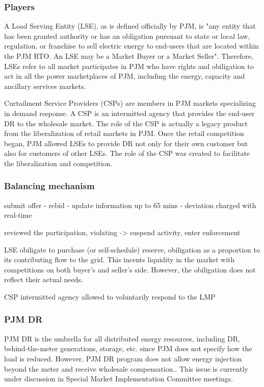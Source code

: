 \subsubsection{Players}
A Load Serving Entity (LSE), as is defined officially by PJM, is "any entity that has been granted authority or has an obligation pursuant to state or local law, regulation, or franchise to sell electric energy to end-users that are located within the PJM RTO. An LSE may be a Market Buyer or a Market Seller"\cite{PJM2017b}. Therefore, LSEs refer to all market participates in PJM who have rights and obiligation to act in all the power marketplaces of PJM, including the energy, capacity and ancillary services markets. 

Curtailment Service Providers (CSPs) are members in PJM markets specializing in demand response. A CSP is an intermitted agency that provides the end-user DR to the wholesale market. \cite{PJM2017b} \cite{Wang2015} The role of the CSP is actually a legacy product from the liberalization of retail markets in PJM. Once the retail competition began, PJM allowed LSEs to provide DR not only for their own customer but also for customers of other LSEs. The role of the CSP was created to facilitate the liberalization and competition. \cite{PJMInterconnection2017}

\subsubsection{Balancing mechanism}
submit offer - rebid - update information up to 65 mins - deviation charged with real-time

reviewed the participation, violating -> suspend activity, enter enforcement

LSE obiligate to purchase (or self-schedule) reserve, obiligation as a proportion to its contributing flow to the grid. \cite{PJM2017c} This incents liquidity in the market with competitions on both buyer's and seller's side. However, the obiligation does not reflect their actual needs.\cite{Wartsila2014}

CSP
intermitted agency
allowed to voluntarily respond to the LMP

\subsubsection{PJM DR}

PJM DR is the umbrella for all distributed energy resources, including DR, behind-the-meter generations, storage, etc. since PJM does not specify how the load is reduced. However, PJM DR program does not allow energy injection beyond the meter and receive wholesale compensation.\cite{PJMInterconnection2017}. This issue is currently under discussion in Special Market Implementation Committee meetings.

